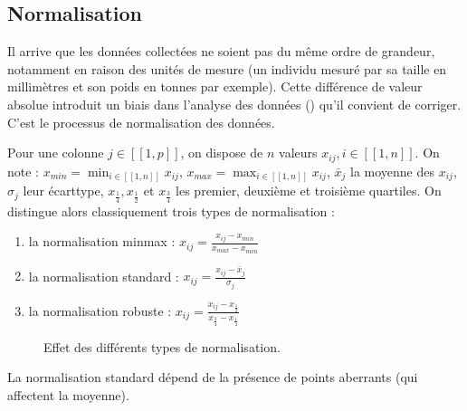\documentclass[letterpaper,10pt,french]{sphinxmanual}
\begin{document}
\subsection{Normalisation}
\label{\detokenize{statsdescriptives:normalisation}}
\sphinxAtStartPar
Il arrive que les données collectées ne soient pas du même ordre de grandeur, notamment en raison des unités de mesure (un individu mesuré par sa taille en millimètres et son poids en tonnes par exemple). Cette différence de valeur absolue introduit un biais dans l’analyse des données ({\hyperref[\detokenize{statsdescriptives:biais}]{}}) qu’il convient de corriger. C’est le processus de normalisation des données.

\sphinxAtStartPar
Pour une colonne \(j\in[\![1,p]\!]\), on dispose de \(n\) valeurs \(x_{ij},i\in[\![1,n]\!]\). On note : \(x_{min} = \displaystyle\min_{i\in[\![1,n]\!]}x_{ij}\), \(x_{max} = \displaystyle\max_{i\in[\![1,n]\!]}x_{ij}\),   \(\bar x_j\) la moyenne des \(x_{ij}\), \(\sigma_j\) leur écart\sphinxhyphen{}type, \(x_\frac14, x_\frac12\) et \(x_\frac34\) les premier, deuxième et troisième quartiles. On distingue alors classiquement trois types de normalisation :
\begin{enumerate}
%
\item {} 
\sphinxAtStartPar
la normalisation min\sphinxhyphen{}max : \(x_{ij} = \frac{x_{ij}-x_{min}}{x_{max}-x_{min}}\)

\item {} 
\sphinxAtStartPar
la normalisation standard : \(x_{ij}=\frac{x_{ij}-\bar x_j}{\sigma_j}\)

\item {} 
\sphinxAtStartPar
la normalisation robuste : \(x_{ij}=\frac{x_{ij}-x_\frac12}{x_\frac34-x_\frac14}\)

\end{enumerate}

\begin{figure}[htbp]
\centering
\capstart

\noindent{}
\caption{Effet des différents types de normalisation.}\label{\detokenize{statsdescriptives:id1}}\end{figure}

\sphinxAtStartPar
La normalisation standard dépend de la présence de points aberrants (qui affectent la moyenne).
\end{document}
